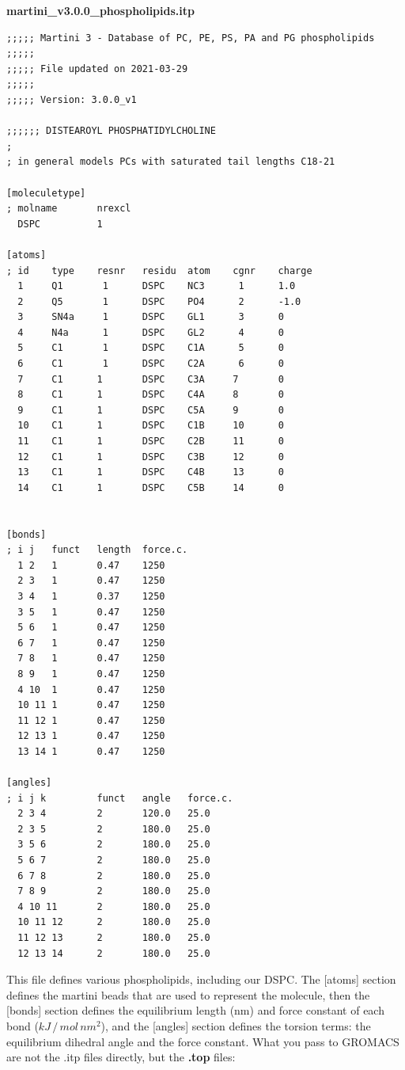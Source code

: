 \begin{vlinesbox}
\fontsize{8pt}{7pt}\selectfont
\textbf{martini\_v3.0.0\_phospholipids.itp}
\begin{verbatim}
;;;;; Martini 3 - Database of PC, PE, PS, PA and PG phospholipids
;;;;;
;;;;; File updated on 2021-03-29
;;;;;
;;;;; Version: 3.0.0_v1

;;;;;; DISTEAROYL PHOSPHATIDYLCHOLINE
;  
; in general models PCs with saturated tail lengths C18-21
   
[moleculetype]  
; molname       nrexcl  
  DSPC          1

[atoms]  
; id    type    resnr   residu  atom    cgnr    charge
  1     Q1       1      DSPC    NC3      1      1.0
  2     Q5       1      DSPC    PO4      2      -1.0
  3     SN4a     1      DSPC    GL1      3      0
  4     N4a      1      DSPC    GL2      4      0
  5     C1       1      DSPC    C1A      5      0
  6     C1       1      DSPC    C2A      6      0
  7     C1      1       DSPC    C3A     7       0
  8     C1      1       DSPC    C4A     8       0
  9     C1      1       DSPC    C5A     9       0
  10    C1      1       DSPC    C1B     10      0
  11    C1      1       DSPC    C2B     11      0
  12    C1      1       DSPC    C3B     12      0
  13    C1      1       DSPC    C4B     13      0
  14    C1      1       DSPC    C5B     14      0


[bonds]
; i j   funct   length  force.c.
  1 2   1       0.47    1250
  2 3   1       0.47    1250
  3 4   1       0.37    1250
  3 5   1       0.47    1250
  5 6   1       0.47    1250
  6 7   1       0.47    1250
  7 8   1       0.47    1250
  8 9   1       0.47    1250
  4 10  1       0.47    1250
  10 11 1       0.47    1250
  11 12 1       0.47    1250
  12 13 1       0.47    1250
  13 14 1       0.47    1250

[angles]
; i j k         funct   angle   force.c.
  2 3 4         2       120.0   25.0
  2 3 5         2       180.0   25.0
  3 5 6         2       180.0   25.0
  5 6 7         2       180.0   25.0
  6 7 8         2       180.0   25.0
  7 8 9         2       180.0   25.0
  4 10 11       2       180.0   25.0
  10 11 12      2       180.0   25.0
  11 12 13      2       180.0   25.0
  12 13 14      2       180.0   25.0
\end{verbatim}
\end{vlinesbox}

This file defines various phospholipids, including our DSPC. The [atoms] section defines the martini beads
that are used to represent the molecule, then the [bonds] section defines the equilibrium length (nm) and force constant
of each bond ($kJ\, / \,mol\,nm^2$), and the [angles] section defines the torsion terms: the equilibrium dihedral angle and the force constant.
\medskip \newline \noindent
What you pass to GROMACS are not the .itp files directly, but the \textbf{.top} files:

